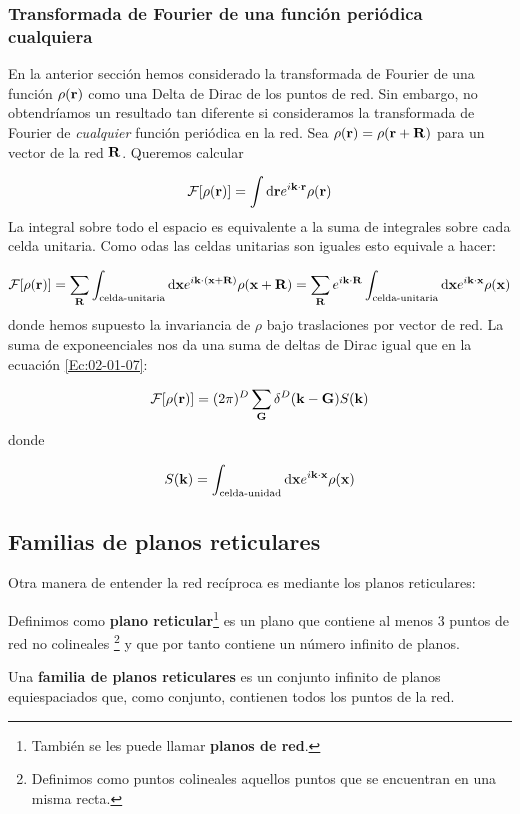 \subsubsection{Transformada de Fourier de una función periódica cualquiera}

En la anterior sección hemos considerado la transformada de Fourier de una función $\rho(\mathbf{r})$ como una Delta de Dirac de los puntos de red. Sin embargo, no obtendríamos un resultado tan diferente si consideramos la transformada de Fourier de \textit{cualquier} función periódica en la red. Sea $\rho(\mathbf{r})=\rho(\mathbf{r}+\mathbf{R})$ para un vector de la red $\mathbf{R}$. Queremos calcular 

\begin{equation}
	\mathcal{F} [\rho(\mathbf{r})] = \int \mathrm{d} \mathbf{r} e^{i \mathbf{k} \cdot \mathbf{r}} \rho (\mathbf{r})
\end{equation}	
La integral sobre todo el espacio es equivalente a la suma de integrales sobre cada celda unitaria. Como odas las celdas unitarias son iguales esto equivale a hacer:

\begin{equation}
	\mathcal{F} [\rho(\mathbf{r})] = \sum_{\mathbf{R}}\int_{\text{celda-unitaria}} \mathrm{d} \mathbf{x} e^{i \mathbf{k} \cdot (\mathbf{x} + \mathbf{R})} \rho (\mathbf{x} + \mathbf{R})  = \sum_{\mathbf{R}} e^{i \mathbf{k} \cdot \mathbf{R}} \int_{\text{celda-unitaria}} \mathrm{d} \mathbf{x} e^{i \mathbf{k} \cdot \mathbf{x}} \rho (\mathbf{x})
\end{equation}
donde hemos supuesto la invariancia de $\rho$ bajo traslaciones por vector de red. La suma de exponeenciales nos da una suma de deltas de Dirac igual que en la ecuación  \ref{Ec:02-01-07}:

\begin{equation}
	\mathcal{F} [\rho(\mathbf{r})] = (2\pi)^D \sum_{\mathbf{G}} \delta^D (\mathbf{k} - \mathbf{G}) S(\mathbf{k})
\end{equation}
donde 

\begin{equation}
	S(\mathbf{k}) = \int_{\text{celda-unidad}} \mathrm{d} \mathbf{x} e^{i \mathbf{k} \cdot \mathbf{x}} \rho (\mathbf{x})
\end{equation}	

\subsection{Familias de planos reticulares}

Otra manera de entender la red recíproca es mediante los planos reticulares:

\begin{definition}  %
	Definimos como \textbf{plano reticular}\footnote{También se les puede llamar \textbf{planos de red}.} es un plano que contiene al menos 3 puntos de red no colineales \footnote{Definimos como puntos colineales aquellos puntos que se encuentran en una misma recta.} y que por tanto contiene un número infinito de planos.
\end{definition}
\begin{definition} %
	Una \textbf{familia de planos reticulares} es un conjunto infinito de planos equiespaciados que, como conjunto, contienen todos los puntos de la red.
\end{definition}

